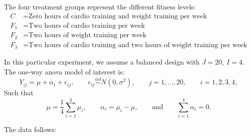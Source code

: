 \documentclass[letterpaper]{article}
\begin{document}
	The four treatment groups represent the different fitness levels:
	\[
	\begin{aligned}
		C   & = \text{Zero hours of cardio training and weight training per week} \\
		F_1 & = \text{Two hours of cardio training per week} \\
		F_2 & = \text{Two hours of weight training per week} \\
		F_3 & = \text{Two hours of cardio training and two hours of weight training per week}
	\end{aligned}
	\]
	
	In this particular experiment, we assume a balanced design with $J=20,\ I=4$. The one-way anova model of interest is:
	\begin{equation}
		Y_{ij}=\mu+\alpha_i+\epsilon_{ij},
		\qquad
		\epsilon_{ij}\overset{iid}{\sim}N(0,\sigma^2),
		\qquad
		j=1,\ldots,20,
		\qquad
		i=1,2,3,4,
	\end{equation}
	Such that
	\begin{equation}
		\mu=\frac{1}{4}\sum_{i=1}^4 \mu_i,
		\qquad
		\alpha_i=\mu_i-\mu,
		\qquad \text{and} \qquad
		\sum_{i=1}^4 \alpha_i=0.
	\end{equation}
	
	The data follows:
	
\end{document}
